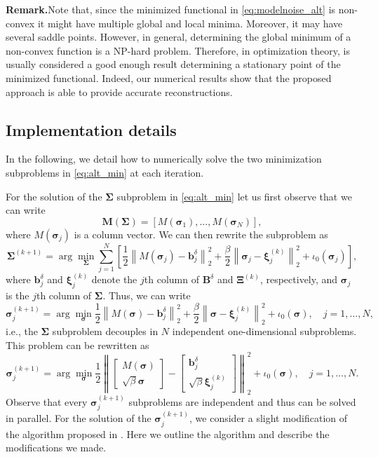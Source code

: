 \documentclass[final,leqno]{siamltex}
\newcommand{\norm}[1]{\left\| #1 \right\|}
\newcommand{\sigmab}{\boldsymbol{\sigma}}
\newcommand{\xib}{\boldsymbol{\xi}}
\newcommand{\Sigmab}{\mathbf{\Sigma}}
\begin{document}
\textbf{Remark.}Note that, since the minimized functional in \eqref{eq:modelnoise_alt} is non-convex it might have multiple global and local minima. Moreover, it may have several saddle points. However, in general, determining the global minimum of a non-convex function is a NP-hard problem. Therefore, in optimization theory, is usually considered a good enough result determining a stationary point of the minimized functional. Indeed, our numerical results show that the proposed approach is able to provide accurate reconstructions.

\subsection{Implementation details}
In the following, we detail how to numerically solve the two minimization subproblems in \eqref{eq:alt_min} at each iteration.

For the solution of the $\Sigmab$ subproblem in \eqref{eq:alt_min} let us first observe that we can write
$$
\mathbf{M}(\Sigmab)=[M(\sigmab_1),\ldots,M(\sigmab_N)],
$$
where $M(\sigmab_j)$ is a column vector. We can then rewrite the subproblem as
$$
\mathbf{\Sigma}^{(k+1)}=\arg\min_{\Sigmab}\sum_{j=1}^{N}\left[\frac{1}{2}\norm{M(\sigmab_j)-\mathbf{b}_j^\delta}_2^2+\frac{\beta}{2}\norm{\sigmab_j-\xib^{(k)}_j}_2^2+\iota_0(\sigmab_j)\right],
$$
where $\mathbf{b}_j^\delta$ and $\xib^{(k)}_j$ denote the $j$th column of $\mathbf{B}^\delta$ and $\mathbf{\Xi}^{(k)}$, respectively, and $\sigmab_j$ is the $j$th column of $\mathbf{\Sigma}$. Thus, we can write
$$
\sigmab_j^{(k+1)}=\arg\min_{\sigmab}\frac{1}{2}\norm{M(\sigmab)-\mathbf{b}_j^\delta}_2^2+\frac{\beta}{2}\norm{\sigmab-\xib^{(k)}_j}_2^2+\iota_0(\sigmab),\quad j=1,\ldots,N,
$$ 
i.e., the $\Sigmab$ subproblem decouples in $N$ independent one-dimensional subproblems. This problem can be rewritten as
\begin{equation}\label{eq:Sigma_sub}
\sigmab_j^{(k+1)}=\arg\min_{\sigmab}\frac{1}{2}\norm{\begin{bmatrix}M(\sigmab)\\\sqrt{\beta}\sigmab\end{bmatrix}-\begin{bmatrix}\mathbf{b}_j^\delta\\\sqrt{\beta}\xib^{(k)}_j\end{bmatrix}}_2^2+\iota_0(\sigmab),\quad j=1,\ldots,N.
\end{equation}
Observe that every $\sigmab_j^{(k+1)}$ subproblems are independent and thus can be solved in parallel. For the solution of the $\sigmab_j^{(k+1)}$, we consider a slight modification of the algorithm proposed in \cite{dfr14,dr16,ddr17,ddrv18,ddrv19,ddflr20}. Here we outline the algorithm and describe the modifications we made.
\end{document}
